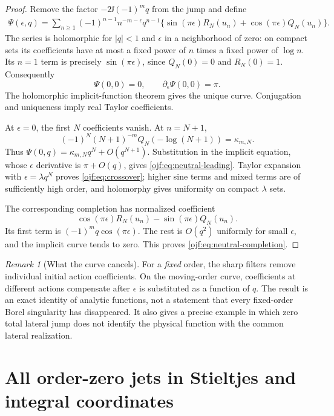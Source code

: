 \documentclass[11pt,a4paper]{article}
\numberwithin{equation}{section}
\theoremstyle{definition}\newtheorem{definition}[theorem]{Definition}
\theoremstyle{remark}\newtheorem{remark}[theorem]{Remark}
\begin{document}
\begin{proof}
Remove the factor $-2\ii(-1)^m q$ from the jump and define
\begin{align}
 \Psi(\epsilon,q)=\sum_{n\ge1}(-1)^{n-1}n^{-m-\epsilon}q^{n-1}
 \{\sin(\pi\epsilon)R_N(u_n)+
                  \cos(\pi\epsilon)Q_N(u_n)\}.\label{ojf:eq:Psi}
\end{align}
The series is holomorphic for $|q|<1$ and $\epsilon$ in a neighborhood
of zero: on compact sets its coefficients have at most a fixed power of
$n$ times a fixed power of $\log n$. Its $n=1$ term is precisely
$\sin(\pi\epsilon)$, since $Q_N(0)=0$ and $R_N(0)=1$.
Consequently
\[
 \Psi(0,0)=0,\qquad \partial_\epsilon\Psi(0,0)=\pi.
\]
The holomorphic implicit-function theorem gives the unique curve.
Conjugation and uniqueness imply real Taylor coefficients.

At $\epsilon=0$, the first $N$ coefficients vanish. At $n=N+1$,
\[
 (-1)^N(N+1)^{-m}Q_N(-\log(N+1))=\kappa_{m,N}.
\]
Thus $\Psi(0,q)=\kappa_{m,N}q^N+O(q^{N+1})$. Substitution in the
implicit equation, whose $\epsilon$ derivative is $\pi+O(q)$, gives
\eqref{ojf:eq:neutral-leading}. Taylor expansion with
$\epsilon=\lambda q^N$ proves \eqref{ojf:eq:crossover}; higher sine
terms and mixed terms are of sufficiently high order, and holomorphy
gives uniformity on compact $\lambda$ sets.

The corresponding completion has normalized coefficient
\[
 \cos(\pi\epsilon)R_N(u_n)-\sin(\pi\epsilon)Q_N(u_n).
\]
Its first term is $(-1)^m q\cos(\pi\epsilon)$. The rest is $O(q^2)$
uniformly for small $\epsilon$, and the implicit curve tends to zero.
This proves \eqref{ojf:eq:neutral-completion}.
\end{proof}

\begin{remark}[What the curve cancels]
For a \emph{fixed} order, the sharp filters remove individual initial
action coefficients. On the moving-order curve, coefficients at different
actions compensate after $\epsilon$ is substituted as a function of $q$.
The result is an exact identity of analytic functions, not a statement
that every fixed-order Borel singularity has disappeared. It also gives
a precise example in which zero total lateral jump does not identify the
physical function with the common lateral realization.
\end{remark}

\section{All order-zero jets in Stieltjes and integral coordinates}
\label{ojf:sec:stieltjes}
\end{document}
